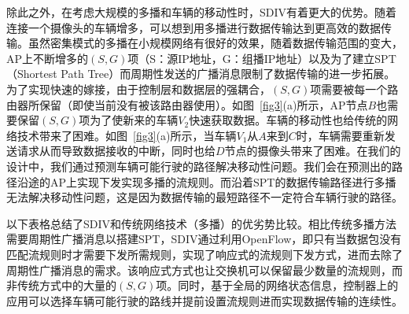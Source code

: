\documentclass{ctexart}
\begin{document}
除此之外，在考虑大规模的多播和车辆的移动性时，SDIV有着更大的优势。随着连接一个摄像头的车辆增多，可以想到用多播进行数据传输达到更高效的数据传输。虽然密集模式的多播在小规模网络有很好的效果，随着数据传输范围的变大，AP上不断增多的$(S,G)$项（S：源IP地址，G：组播IP地址）以及为了建立SPT（Shortest Path Tree）而周期性发送的广播消息限制了数据传输的进一步拓展。为了实现快速的嫁接，由于控制层和数据层的强耦合，$(S,G)$项需要被每一个路由器所保留（即使当前没有被该路由器使用）。如图~\ref{fig3}(a)所示，AP节点$B$也需要保留$(S,G)$项为了使新来的车辆$V_{2}$快速获取数据。车辆的移动性也给传统的网络技术带来了困难。如图~\ref{fig3}(a)所示，当车辆$V_{1}$从$A$来到$C$时，车辆需要重新发送请求从而导致数据接收的中断，同时也给$D$节点的摄像头带来了困难。在我们的设计中，我们通过预测车辆可能行驶的路径解决移动性问题。我们会在预测出的路径沿途的AP上实现下发实现多播的流规则。而沿着SPT的数据传输路径进行多播无法解决移动性问题，这是因为数据传输的最短路径不一定符合车辆行驶的路径。


以下表格总结了SDIV和传统网络技术（多播）的优劣势比较。相比传统多播方法需要周期性广播消息以搭建SPT，SDIV通过利用OpenFlow，即只有当数据包没有匹配流规则时才需要下发所需规则，实现了响应式的流规则下发方式，进而去除了周期性广播消息的需求。该响应式方式也让交换机可以保留最少数量的流规则，而非传统方式中的大量的$(S,G)$项。同时，基于全局的网络状态信息，控制器上的应用可以选择车辆可能行驶的路线并提前设置流规则进而实现数据传输的连续性。
\end{document}
